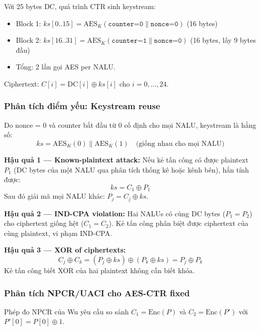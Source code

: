 Với 25 bytes DC, quá trình CTR sinh keystream:
\begin{itemize}
  \item Block 1: $ks[0..15] = \text{AES}_K(\texttt{counter=0} \| \texttt{nonce=0})$ (16 bytes)
  \item Block 2: $ks[16..31] = \text{AES}_K(\texttt{counter=1} \| \texttt{nonce=0})$ (16 bytes, lấy 9 bytes đầu)
  \item Tổng: 2 lần gọi AES per NALU.
\end{itemize}

Ciphertext: $C[i] = \text{DC}[i] \oplus ks[i]$ cho $i = 0, \ldots, 24$.

\subsubsection{Phân tích điểm yếu: Keystream reuse}

Do nonce = 0 và counter bắt đầu từ 0 cố định cho mọi NALU, keystream là hằng số:
\begin{equation}
ks = \text{AES}_K(0) \| \text{AES}_K(1) \quad \text{(giống nhau cho mọi NALU)}
\end{equation}

\textbf{Hậu quả 1 --- Known-plaintext attack:}
Nếu kẻ tấn công có được plaintext $P_1$ (DC bytes của một NALU qua phân tích
thống kê hoặc kênh bên), hắn tính được:
\begin{equation}
ks = C_1 \oplus P_1
\end{equation}
Sau đó giải mã mọi NALU khác: $P_j = C_j \oplus ks$.

\textbf{Hậu quả 2 --- IND-CPA violation:}
Hai NALUs có cùng DC bytes ($P_1 = P_2$) cho ciphertext giống hệt ($C_1 = C_2$).
Kẻ tấn công phân biệt được ciphertext của cùng plaintext, vi phạm IND-CPA.

\textbf{Hậu quả 3 --- XOR of ciphertexts:}
\begin{equation}
C_j \oplus C_k = (P_j \oplus ks) \oplus (P_k \oplus ks) = P_j \oplus P_k
\end{equation}
Kẻ tấn công biết XOR của hai plaintext không cần biết khóa.

\subsubsection{Phân tích NPCR/UACI cho AES-CTR fixed}

Phép đo NPCR của Wu \cite{wu_npcr} yêu cầu so sánh $C_1 = \text{Enc}(P)$
và $C_2 = \text{Enc}(P')$ với $P'[0] = P[0] \oplus 1$.

